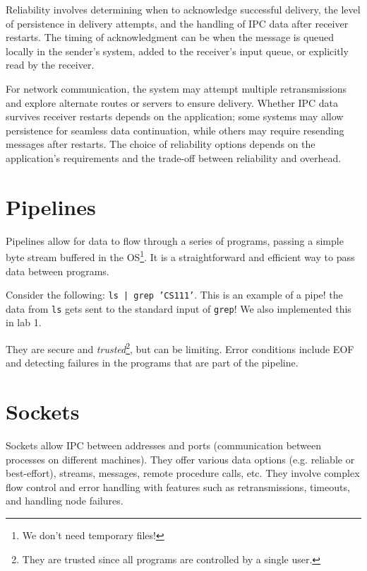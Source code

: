 \documentclass{report}
\newcommand{\exampleBegin}[1]{\begin{tcolorbox}[colback=blue!5!white,colframe=black!75!blue,title={Example:
      #1}]}
\newcommand{\exampleEnd}{\end{tcolorbox}}
\begin{document}
Reliability involves determining when to acknowledge successful delivery, the level of persistence
in delivery attempts, and the handling of IPC data after receiver restarts. The timing of
acknowledgment can be when the message is queued locally in the sender's system, added to the
receiver's input queue, or explicitly read by the receiver. 

For network communication, the system may attempt multiple retransmissions and explore alternate routes or
servers to ensure delivery. Whether IPC data survives receiver restarts depends on the application;
some systems may allow persistence for seamless data continuation, while others may require
resending messages after restarts. The choice of reliability options depends on the application's
requirements and the trade-off between reliability and overhead. 





\section{Pipelines}
Pipelines allow for data to flow through a series of programs, passing a simple byte stream buffered
in the OS\footnote{We don't need temporary files!}. It is a straightforward and efficient way to
pass data between programs.

\exampleBegin{Pipe Up!}
Consider the following: \texttt{ls | grep 'CS111'}. This is an example of a pipe! the data from
\texttt{ls} gets sent to the standard input of \texttt{grep}! We also implemented this in lab 1.
\exampleEnd

They are secure and \textit{trusted}\footnote{They are trusted since all programs are controlled by
  a single user.}, but can be limiting. Error conditions include EOF and detecting failures in the
programs that are part of the pipeline.





\section{Sockets}
Sockets allow IPC between addresses and ports (communication between processes on different
machines). They offer various data options (e.g. reliable or best-effort), streams, messages, remote
procedure calls, etc. They involve complex flow control and error handling with features such as
retransmissions, timeouts, and handling node failures. 
\end{document}
